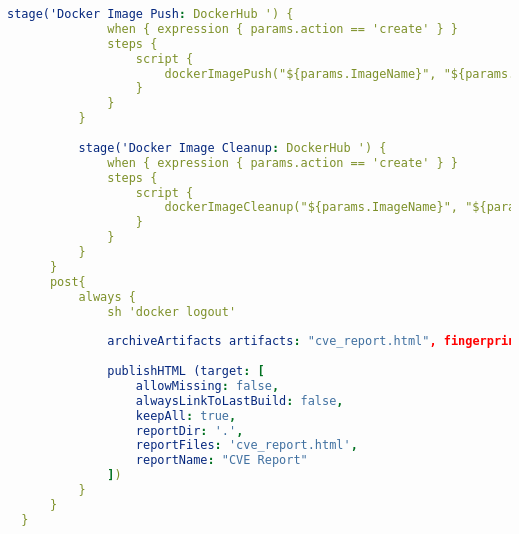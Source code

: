 \begin{lstlisting}[language=yaml, style=yamlstyle]
          stage('Docker Image Push: DockerHub ') {
              when { expression { params.action == 'create' } }
              steps {
                  script {
                      dockerImagePush("${params.ImageName}", "${params.ImageTag}", '$DOCKERHUBID_USR')
                  }
              }
          }
  
          stage('Docker Image Cleanup: DockerHub ') {
              when { expression { params.action == 'create' } }
              steps {
                  script {
                      dockerImageCleanup("${params.ImageName}", "${params.ImageTag}", '$DOCKERHUBID_USR')
                  }
              }
          }
      }
      post{
          always {
              sh 'docker logout'
  
              archiveArtifacts artifacts: "cve_report.html", fingerprint: true
  
              publishHTML (target: [
                  allowMissing: false,
                  alwaysLinkToLastBuild: false,
                  keepAll: true,
                  reportDir: '.',
                  reportFiles: 'cve_report.html',
                  reportName: "CVE Report"
              ])
          }
      }
  }
\end{lstlisting}
